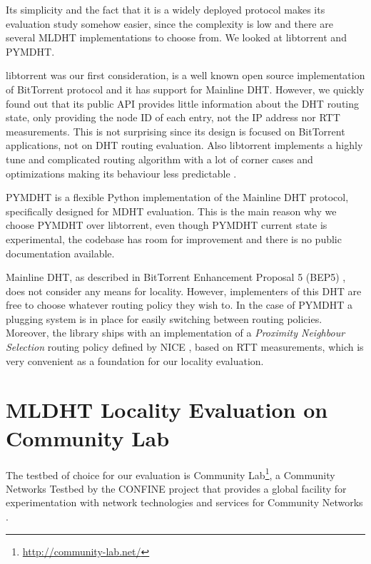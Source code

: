 \documentclass[conference]{IEEEtran}
\begin{document}
Its simplicity and the fact that it is a widely deployed protocol makes its evaluation study somehow easier, since the complexity is low and there are several MLDHT implementations to choose from. We looked at libtorrent and PYMDHT.

libtorrent \cite{b6} was our first consideration, is a well known open source implementation of BitTorrent protocol and it has support for Mainline DHT. However, we quickly found out that its public API provides little information about the DHT routing state, only providing the node ID of each entry, not the IP address nor RTT measurements. This is not surprising since its design is focused on BitTorrent applications, not on DHT routing evaluation. Also libtorrent implements a highly tune and complicated routing algorithm with a lot of corner cases and optimizations making its behaviour less predictable \cite{b1}.

PYMDHT \cite{b8} is a flexible Python implementation of the Mainline DHT protocol, specifically designed for MDHT evaluation. This is the main reason why we choose PYMDHT over libtorrent, even though PYMDHT current state is experimental, the codebase has room for improvement and there is no public documentation available.

Mainline DHT, as described in BitTorrent Enhancement Proposal 5 (BEP5) \cite{b9}, does not consider any means for locality. However, implementers of this DHT are free to choose whatever routing policy they wish to. In the case of PYMDHT a plugging system is in place for easily switching between routing policies. Moreover, the library ships with an implementation of a \textit{Proximity Neighbour Selection} routing policy defined by NICE \cite{b18}, based on RTT measurements, which is very convenient as a foundation for our locality evaluation.

\section{MLDHT Locality Evaluation on \\ Community Lab}

The testbed of choice for our evaluation is Community Lab\footnote{\url{http://community-lab.net/}}, a Community Networks Testbed by the CONFINE project that provides a global facility for experimentation with network technologies and services for Community Networks \cite{b16}.
\end{document}
